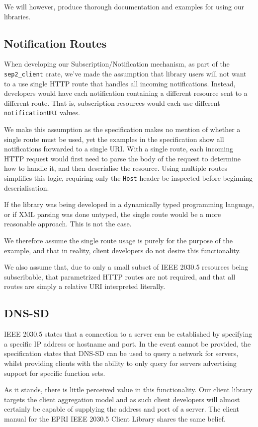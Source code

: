 We will however, produce thorough documentation and examples for using our libraries.

\subsection{Notification Routes}
When developing our Subscription/Notification mechanism, as part of the \texttt{sep2\_client} crate, we've made the assumption that library users will not want to a use single HTTP route that handles all incoming notifications. Instead, developers would have each notification containing a different resource sent to a different route. That is, subscription resources would each use different \texttt{notificationURI} values.

We make this assumption as the specification makes no mention of whether a single route must be used, yet the examples in the specification show all notifications forwarded to a single URI. With a single route, each incoming HTTP request would first need to parse the body of the request to determine how to handle it, and then deserialise the resource. Using multiple routes simplifies this logic, requiring only the \texttt{Host} header be inspected before beginning deserialisation. 

If the library was being developed in a dynamically typed programming language, or if XML parsing was done untyped, the single route would be a more reasonable approach. This is not the case.

We therefore assume the single route usage is purely for the purpose of the example, and that in reality, client developers do not desire this functionality.

We also assume that, due to only a small subset of IEEE 2030.5 resources being subscribable, that parametrized HTTP routes are not required, and that all routes are simply a relative URI interpreted literally.

\subsection{DNS-SD}
IEEE 2030.5 states that a connection to a server can be established by specifying a specific IP address or hostname and port. In the event cannot be provided, the specification states that DNS-SD can be used to query a network for servers, whilst providing clients with the ability to only query for servers advertising support for specific function sets. 

As it stands, there is little perceived value in this functionality. Our client library targets the client aggregation model and as such client developers will almost certainly be capable of supplying the address and port of a server.
The client manual for the EPRI IEEE 2030.5 Client Library shares the same belief. \cite{eprimanual}

